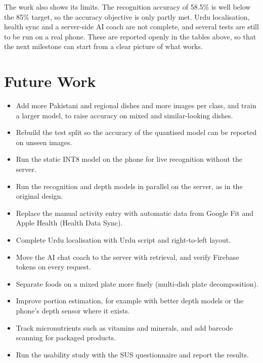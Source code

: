 The work also shows its limits. The recognition accuracy of 58.5\% is well below the 85\% target, so the accuracy
objective is only partly met. Urdu localisation, health sync and a server-side AI coach are not complete, and several
tests are still to be run on a real phone. These are reported openly in the tables above, so that the next milestone
can start from a clear picture of what works.

\section{Future Work}
\begin{itemize}[noitemsep]
  \item Add more Pakistani and regional dishes and more images per class, and train a larger model, to raise accuracy
        on mixed and similar-looking dishes.
  \item Rebuild the test split so the accuracy of the quantised model can be reported on unseen images.
  \item Run the static INT8 model on the phone for live recognition without the server.
  \item Run the recognition and depth models in parallel on the server, as in the original design.
  \item Replace the manual activity entry with automatic data from Google Fit and Apple Health (Health Data Sync).
  \item Complete Urdu localisation with Urdu script and right-to-left layout.
  \item Move the AI chat coach to the server with retrieval, and verify Firebase tokens on every request.
  \item Separate foods on a mixed plate more finely (multi-dish plate decomposition).
  \item Improve portion estimation, for example with better depth models or the phone's depth sensor where it exists.
  \item Track micronutrients such as vitamins and minerals, and add barcode scanning for packaged products.
  \item Run the usability study with the SUS questionnaire and report the results.
\end{itemize}
